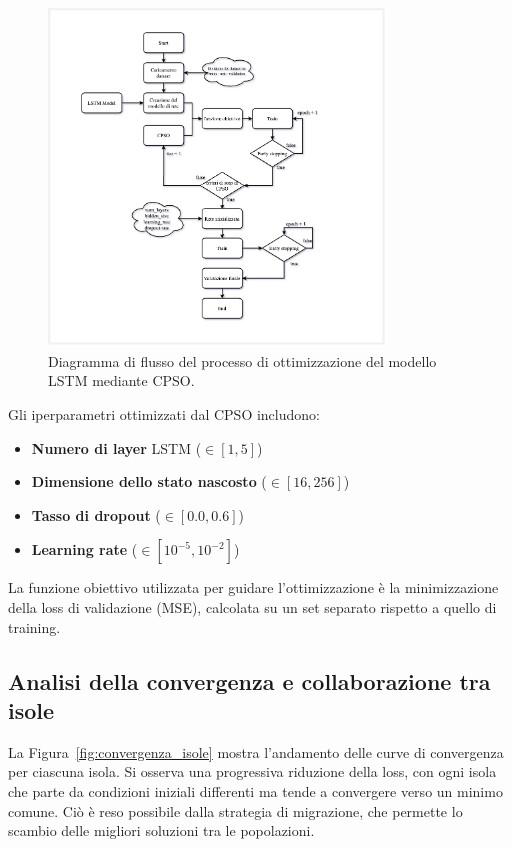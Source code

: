 \documentclass{article}
\begin{document}
\begin{figure}[H]
\centering
\includegraphics[width=0.8\textwidth]{img/LSTM-CPSO-MODEL.png}
\caption{Diagramma di flusso del processo di ottimizzazione del modello LSTM mediante CPSO.}
\label{fig:cpso_flowchart}
\end{figure}

Gli iperparametri ottimizzati dal CPSO includono:
\begin{itemize}
    \item \textbf{Numero di layer} LSTM ($\in [1, 5]$)
    \item \textbf{Dimensione dello stato nascosto} ($\in [16, 256]$)
    \item \textbf{Tasso di dropout} ($\in [0.0, 0.6]$)
    \item \textbf{Learning rate} ($\in [10^{-5}, 10^{-2}]$)
\end{itemize}

La funzione obiettivo utilizzata per guidare l’ottimizzazione è la minimizzazione della loss di validazione 
(MSE), calcolata su un set separato rispetto a quello di training.

\subsection*{Analisi della convergenza e collaborazione tra isole}

La Figura~\ref{fig:convergenza_isole} mostra l'andamento delle curve di convergenza per ciascuna isola. 
Si osserva una progressiva riduzione della loss, con ogni isola che parte da condizioni iniziali differenti 
ma tende a convergere verso un minimo comune. Ciò è reso possibile dalla strategia di migrazione, che 
permette lo scambio delle migliori soluzioni tra le popolazioni.
\end{document}
